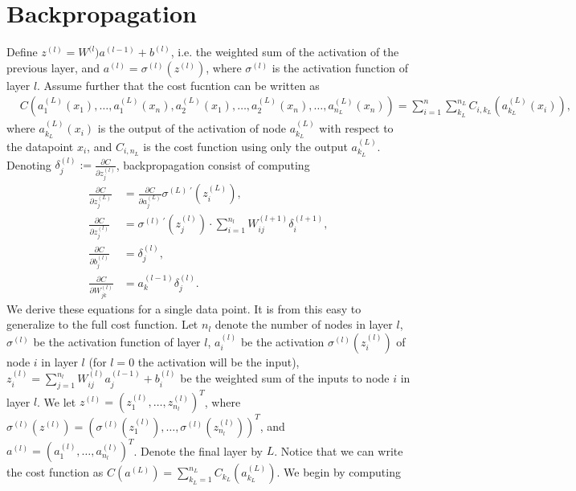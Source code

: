 \section{Backpropagation}
\label{sec:backprop}

Define \(z^{(l)}=W^{(l})a^{(l-1)}+b^{(l)}\), i.e. the weighted sum of the activation of the previous layer, and \(a^{(l)}=\sigma^{(l)}(z^{(l)})\), where \(\sigma^{(l)}\) is the activation function of layer \(l\). Assume further that the cost fucntion can be written as
\begin{align*}
    &C(a^{(L)}_1(x_1),\ldots,a^{(L)}_1(x_n),a^{(L)}_2(x_1),\ldots,a^{(L)}_2(x_n),\ldots,a^{(L)}_{n_L}(x_n))=\sum_{i=1}^n\sum_{k_L}^{n_L}C_{i,k_L}(a^{(L)}_{k_L}(x_i)),
\end{align*}
where \(a^{(L)}_{k_L}(x_i)\) is the output of the activation of node \(a^{(L)}_{k_L}\) with respect to the datapoint \(x_i\), and \(C_{i,n_L}\) is the cost function using only the output \(a^{(L)}_{k_L}\). Denoting \(\delta^{(l)}_j:=\frac{\partial C}{\partial z^{(l)}_j}\), backpropagation consist of computing
\begin{align}
    \frac{\partial C}{\partial z^{(L)}_j} &= \frac{\partial C}{\partial a^{(L)}_j}\sigma^{(L)\;\prime}(z^{(L)}_i), \label{eq:backprop1}
    \\
    \frac{\partial C}{\partial z^{(l)}_j} &= \sigma^{(l)\;\prime}(z^{(l)}_j)\cdot\sum_{i=1}^{n_l}W^{(l+1)}_{ij}\delta^{(l+1)}_i, \label{eq:backprop2}
    \\
    \frac{\partial C}{\partial b^{(l)}_j} &= \delta^{(l)}_j, \label{eq:backprop3}
    \\
    \frac{\partial C}{\partial W^{(l)}_{jk}} &= a^{(l-1)}_k\delta^{(l)}_j. \label{eq:backprop4}
\end{align}
We derive these equations for a single data point. It is from this easy to generalize to the full cost function. Let \(n_l\) denote the number of nodes in layer \(l\), \(\sigma^{(l)}\) be the activation function of layer \(l\), \(a^{(l)}_i\) be the activation \(\sigma^{(l)}(z^{(l)}_i)\) of node \(i\) in layer \(l\) (for \(l=0\) the activation will be the input), \(z^{(l)}_i=\sum_{j=1}^{n_l}W_{ij}^{(l)}a^{(l-1)}_j+b^{(l)}_i\) be the weighted sum of the inputs to node \(i\) in layer \(l\). We let \(z^{(l)}=(z^{(l)}_1,\ldots,z^{(l)}_{n_l})^T\), where \(\sigma^{(l)}(z^{(l)})=(\sigma^{(l)}(z^{(l)}_1),\ldots,\sigma^{(l)}(z^{(l)}_{n_l}))^T\), and \(a^{(l)}=(a^{(l)}_1,\ldots,a^{(l)}_{n_l})^T\). Denote the final layer by \(L\). Notice that we can write the cost function as \(C(a^{(L)})=\sum_{k_L=1}^{n_L}C_{k_L}(a^{(L)}_{k_L})\). We begin by computing
